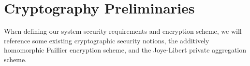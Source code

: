 \documentclass[twocolumn]{autart}
\theoremstyle{definition}
\theoremstyle{remark}
\begin{document}
% 
% 

\section{Cryptography Preliminaries} \label{sec:crypto_prelim}
When defining our system security requirements and encryption scheme, we will reference some existing cryptographic security notions, the additively homomorphic Paillier encryption scheme, and the Joye-Libert private aggregation scheme.

% 
% 
\end{document}
